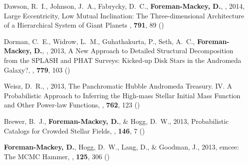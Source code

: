 \item Dawson, R.~I., Johnson,  J.~A., Fabrycky, D.~C.,
    {\bf Foreman-Mackey, D.}, \etal, 2014,
        {Large Eccentricity, Low Mutual Inclination: The Three-dimensional
         Architecture of a Hierarchical System of Giant Planets}
    \apj, \textbf{791}, 89 ()

\item Dorman, C.~E., Widrow, L.~M., Guhathakurta, P., Seth, A.~C.,
    {\bf Foreman-Mackey, D.}, \etal, 2013,
        {A New Approach to Detailed Structural Decomposition from the SPLASH
         and PHAT Surveys: Kicked-up Disk Stars in the Andromeda Galaxy?},
    \apj, \textbf{779}, 103 ()

\item Weisz, D.~R., \etal, 2013,
        {The Panchromatic Hubble Andromeda Treasury. IV. A Probabilistic
         Approach to Inferring the High-mass Stellar Initial Mass Function and
         Other Power-law Functions},
    \apj, \textbf{762}, 123 ()

\item Brewer, B.~J., {\bf Foreman-Mackey, D.}, \& Hogg, D.~W., 2013,
        {Probabilistic Catalogs for Crowded Stellar Fields},
    \aj, \textbf{146}, 7 ()

\item {\bf Foreman-Mackey, D.}, Hogg, D.~W., Lang, D., \& Goodman, J., 2013,
        {emcee: The MCMC Hammer},
    \pasp, \textbf{125}, 306 ()
